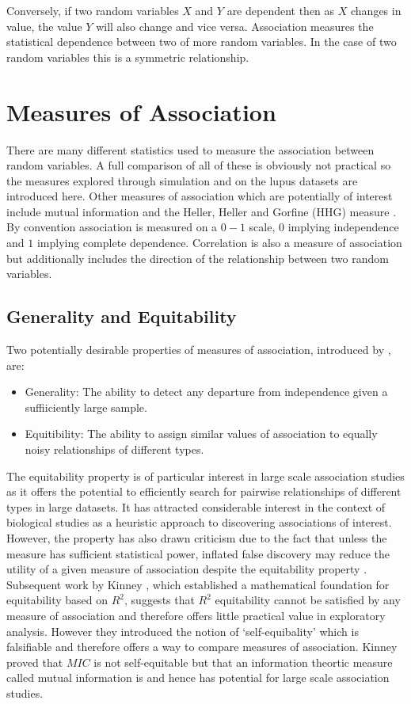 \documentclass[a4paper, 12pt]{report}
\begin{document}
Conversely, if two random variables $X$ and $Y$ are dependent then as $X$ changes in value, the value $Y$ will also change and vice versa. Association measures the statistical dependence between two of more random variables. In the case of two random variables this is a symmetric relationship.

\section{Measures of \gls{Association} }
There are many different statistics used to measure the association between random variables. A full comparison of all of these is obviously not practical so the measures explored through simulation and on the lupus datasets are introduced here. Other measures of association which are potentially of interest include mutual information and the Heller, Heller and Gorfine (HHG) measure \cite{HHG}. By convention association is measured on a $0-1$ scale, $0$ implying independence and $1$ implying complete dependence. \gls{Correlation} is also a measure of association but additionally includes the direction of the relationship between two random variables.

\subsection*{Generality and Equitability}
Two potentially desirable properties of measures of association, introduced by \citet{mic2011}, are:

\begin{itemize}
\item \gls{Generality}: The ability to detect any departure from independence given a suffiiciently large sample.
\item Equitibility: The ability to assign similar values of association to equally noisy relationships of different types.
\end{itemize}

The equitability property is of particular interest in large scale association studies as it offers the potential to efficiently search for pairwise relationships of different types in large datasets. It has attracted considerable interest in the context of biological studies \cite{bigdata2012} as a heuristic approach to discovering associations of interest. However, the property has also drawn criticism due to the fact that unless the measure has sufficient statistical power, inflated false discovery may reduce the utility of a given measure of association despite the equitability property \cite{Tibshirani2011}. Subsequent work by Kinney \cite{Kinney19082014}, which established a mathematical foundation for equitability based on $R^2$, suggests that $R^2$ equitability cannot be satisfied by any measure of association and therefore offers little practical value in exploratory analysis. However they introduced the notion of `self-equibality' which is falsifiable and therefore offers a way to compare measures of association. Kinney \cite{Kinney19082014} proved that $MIC$ is not self-equitable but that an information theortic measure called mutual information is and hence has potential for large scale association studies.
\end{document}
